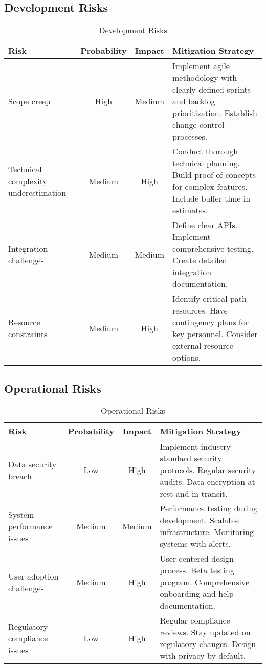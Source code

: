 \documentclass[12pt,a4paper]{article}
\begin{document}
\subsection{Development Risks}

\begin{table}[h]
\begin{tabularx}{\textwidth}{|X|c|c|X|}
\hline
\textbf{Risk} & \textbf{Probability} & \textbf{Impact} & \textbf{Mitigation Strategy} \\
\hline
Scope creep & High & Medium & Implement agile methodology with clearly defined sprints and backlog prioritization. Establish change control processes. \\
\hline
Technical complexity underestimation & Medium & High & Conduct thorough technical planning. Build proof-of-concepts for complex features. Include buffer time in estimates. \\
\hline
Integration challenges & Medium & Medium & Define clear APIs. Implement comprehensive testing. Create detailed integration documentation. \\
\hline
Resource constraints & Medium & High & Identify critical path resources. Have contingency plans for key personnel. Consider external resource options. \\
\hline
\end{tabularx}
\caption{Development Risks}
\end{table}

\subsection{Operational Risks}

\begin{table}[h]
\begin{tabularx}{\textwidth}{|X|c|c|X|}
\hline
\textbf{Risk} & \textbf{Probability} & \textbf{Impact} & \textbf{Mitigation Strategy} \\
\hline
Data security breach & Low & High & Implement industry-standard security protocols. Regular security audits. Data encryption at rest and in transit. \\
\hline
System performance issues & Medium & Medium & Performance testing during development. Scalable infrastructure. Monitoring systems with alerts. \\
\hline
User adoption challenges & Medium & High & User-centered design process. Beta testing program. Comprehensive onboarding and help documentation. \\
\hline
Regulatory compliance issues & Low & High & Regular compliance reviews. Stay updated on regulatory changes. Design with privacy by default. \\
\hline
\end{tabularx}
\caption{Operational Risks}
\end{table}
\end{document}
